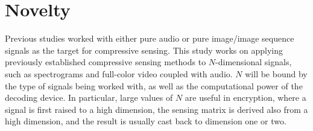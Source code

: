 \section{Novelty}
\label{sec:novel}
Previous studies worked with either pure audio or pure image/image sequence signals as the target for compressive sensing. This study works on applying previously established compressive sensing methods to $N$-dimensional signals, such as spectrograms and full-color video coupled with audio. $N$ will be bound by the type of signals being worked with, as well as the computational power of the decoding device. In particular, large values of $N$ are useful in encryption, where a signal is first raised to a high dimension, the sensing matrix is derived also from a high dimension, and the result is usually cast back to dimension one or two.